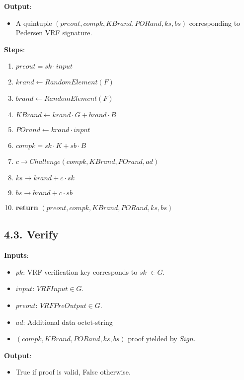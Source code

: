 \documentclass[
]{article}
\providecommand{\tightlist}{%
  \setlength{\itemsep}{0pt}\setlength{\parskip}{0pt}}
\begin{document}
\textbf{Output}:

\begin{itemize}
\tightlist
\item
  A quintuple \((preout, compk, KBrand, PORand, ks, bs)\) corresponding
  to Pedersen VRF signature.
\end{itemize}

\textbf{Steps}:

\begin{enumerate}
\def\labelenumi{\arabic{enumi}.}
\tightlist
\item
  \(preout = sk \cdot input\)
\item
  \(krand \leftarrow RandomElement(F)\)
\item
  \(brand \leftarrow RandomElement(F)\)
\item
  \(KBrand \leftarrow krand \cdot G + brand \cdot B\)
\item
  \(POrand \leftarrow krand \cdot input\)
\item
  \(compk = sk \cdot K + sb \cdot B\)
\item
  \(c \rightarrow Challenge(compk, KBrand, POrand, ad)\)
\item
  \(ks \rightarrow krand + c \cdot sk\)
\item
  \(bs \rightarrow brand + c \cdot sb\)
\item
  \textbf{return} \((preout, compk, KBrand, PORand, ks, bs)\)
\end{enumerate}

\hypertarget{verify-1}{%
\subsection{4.3. Verify}\label{verify-1}}

\textbf{Inputs}:

\begin{itemize}
\tightlist
\item
  \(pk\): VRF verification key corresponds to \(sk\) \(\in G\).
\item
  \(input\): \(VRFInput \in G\).
\item
  \(preout\): \(VRFPreOutput \in G\).
\item
  \(ad\): Additional data octet-string
\item
  \((compk, KBrand, PORand, ks, bs)\) proof yielded by \(Sign\).
\end{itemize}

\textbf{Output}:

\begin{itemize}
\tightlist
\item
  True if proof is valid, False otherwise.
\end{itemize}
\end{document}
